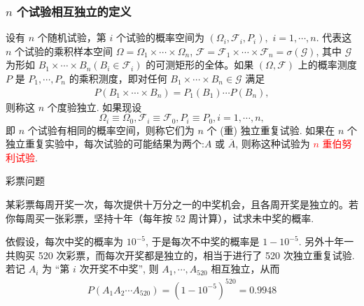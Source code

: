              \begin{frame}
               \frametitle{$n$ 个试验相互独立的定义}

               \begin{defi}
                 设有 $n$ 个随机试验，第 $i$ 个试验的概率空间为 $(\Omega_i,\mathcal{F}_i,P_i),$ $ i=1,\cdots,n$. 代表这 $n$ 个试验的乘积样本空间 $\Omega=\Omega_1\times \cdots \times \Omega_n$, $\mathcal{F}=\mathcal{F}_1\times \cdots\times \mathcal{F}_n=\sigma (\mathcal{G})$, 其中 $\mathcal{G}$ 为形如 $B_1\times\cdots\times B_n (B_i\in\mathcal{F}_i)$ 的可测矩形的全体。如果 $(\Omega,\mathcal{F})$ 上的概率测度 $P$ 是 $P_1,\cdots, P_n$ 的乘积测度，即对任何 $B_1\times\cdots\times B_n\in \mathcal{G}$ 满足
                 \begin{eqnarray*}
                   P(B_1\times\cdots\times B_n)=P_1(B_1)\cdots P(B_n),
                 \end{eqnarray*}
                 则称这 $n$ 个度验独立. \pause 如果现设 $$\Omega_i\equiv \Omega_0, \mathcal{F}_i\equiv \mathcal{F}_0, P_i\equiv P_0, i=1,\cdots,n, $$ 即 $n$ 个试验有相同的概率空间，则称它们为 $n$ 个 (重) 独立重复试验. \pause 如果在 $n$ 个独立重复实验中，每次试验的可能结果为两个:$A$ 或 $\overline{A}$, 则称这种试验为 \textcolor{red}{$n$ 重伯努利试验}.
               \end{defi}
             \end{frame}
                          \begin{frame}{彩票问题}

               \begin{exam}
                 某彩票每周开奖一次，每次提供十万分之一的中奖机会，且各周开奖是独立的。若你每周买一张彩票，坚持十年（每年按 52 周计算），试求未中奖的概率.
               \end{exam}

               \pause  \jieda 依假设，每次中奖的概率为 $10^{-5}$, 于是每次不中奖的概率是 $1-10^{-5}$. 另外十年一共购买 520 次彩票，而每次开奖都是独立的，相当于进行了 520 次独立重复试验. \pause 若记 $A_i$ 为 “第 $i$ 次开奖不中奖”, 则 $A_1,\cdots, A_{520}$ 相互独立，从而
               \begin{eqnarray*}
                 P(A_1A_2\cdots A_{520})=(1-10^{-5})^{520}=0.9948
               \end{eqnarray*}

             \end{frame}
